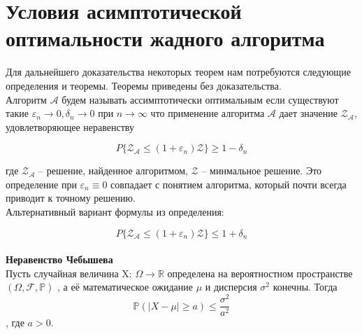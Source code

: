 \documentclass[a4paper, 14pt]{extarticle}
\numberwithin{equation}{section}
\begin{document}
\newcommand{\algorithm}{$\mathcal{A}$}
\newcommand{\topboundE}{$\mathcal{Z^*_{A}}$}
\newcommand{\topboundD}{$\mathcal{D^*_{A}}$}
\newcommand{\randomvalue}{$\mathcal{Z_{A}}$}
\newcommand{\randomvalueE}{$E(\text{\randomvalue})$}
\newcommand{\randomvalueD}{$D(\text{\randomvalue})$}

\section{Условия асимптотической оптимальности жадного алгоритма}

Для дальнейшего доказательства некоторых теорем нам потребуются следующие определения и теоремы. Теоремы приведены без доказательства.\\


Алгоритм $\mathcal{A}$ будем называть ассимптотически оптимальным если существуют такие $\varepsilon_n \rightarrow 0, \delta_n \rightarrow 0$ при $n \rightarrow \infty$ что применение алгоритма $\mathcal{A}$ дает значение  $\mathcal{Z_A}$, удовлетворяющее неравенству
 
\begin{equation}\label{1}
P\{\mathcal{Z_A} \leqslant (1+\varepsilon_n)\mathcal{Z}\}\geqslant 1-\delta_n
\end{equation}

\noindent где $\mathcal{Z_A}$ -- решение, найденное алгоритмом, $\mathcal{Z}$ -- минмальное решение.
Это определение при $\varepsilon_n \equiv 0$ совпадает с понятием алгоритма, который почти всегда приводит к точному решению. \\

Альтернативный вариант формулы из определения:

\begin{equation}
P\{\mathcal{Z_A} \leqslant (1+\varepsilon_n)\mathcal{Z}\}\leqslant 1+\delta_n
\end{equation} \\


\textbf{Неравенство Чебышева} \\

Пусть случайная величина X: $\Omega\rightarrow\mathbb {R}$ определена на вероятностном пространстве $(\Omega,{\mathcal {F}},\mathbb {P})$
, а её математическое ожидание $\mu$ и дисперсия  $\sigma ^{2}$ конечны. Тогда 
\begin{equation}
{\mathbb {P}}\left(|X-\mu |\geqslant a\right)\leqslant {\frac {\sigma ^{2}}{a^{2}}}
\end{equation},
где  $a>0$. \\ \\
\end{document}
